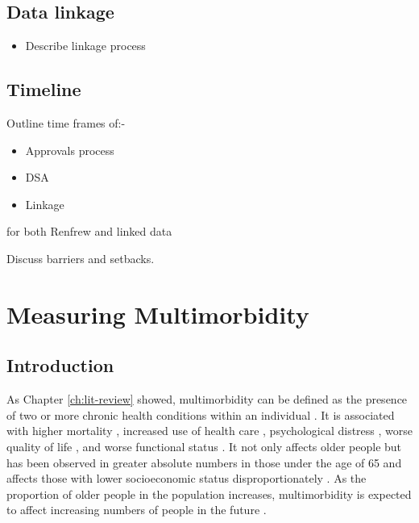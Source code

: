 \documentclass[12pt,]{report}
\providecommand{\tightlist}{%
  \setlength{\itemsep}{0pt}\setlength{\parskip}{0pt}}
\begin{document}
\section{Data linkage}\label{sec:methods-linkage}

\begin{itemize}
\tightlist
\item
  Describe linkage process
\end{itemize}

\section{Timeline}\label{sec:methods-timeline}

Outline time frames of:-

\begin{itemize}
\tightlist
\item
  Approvals process
\item
  DSA
\item
  Linkage
\end{itemize}

for both Renfrew and linked data

Discuss barriers and setbacks.

\FloatBarrier
\newpage
{}

\chapter{Measuring Multimorbidity}\label{ch:clustering}

\section{Introduction}\label{sec:clust-intro}

As Chapter \ref{ch:lit-review} showed, multimorbidity can be defined as
the presence of two or more chronic health conditions within an
individual \citep{RN226}. It is associated with higher mortality
\citep{RN81}, increased use of health care \citep{RN81, RN22},
psychological distress \citep{RN243}, worse quality of life
\citep{RN241, RN242}, and worse functional status \citep{RN40}. It not
only affects older people but has been observed in greater absolute
numbers in those under the age of 65 and affects those with lower
socioeconomic status disproportionately \citep{RN33}. As the proportion
of older people in the population increases, multimorbidity is expected
to affect increasing numbers of people in the future
\citep{RN155, RN288}.
\end{document}
